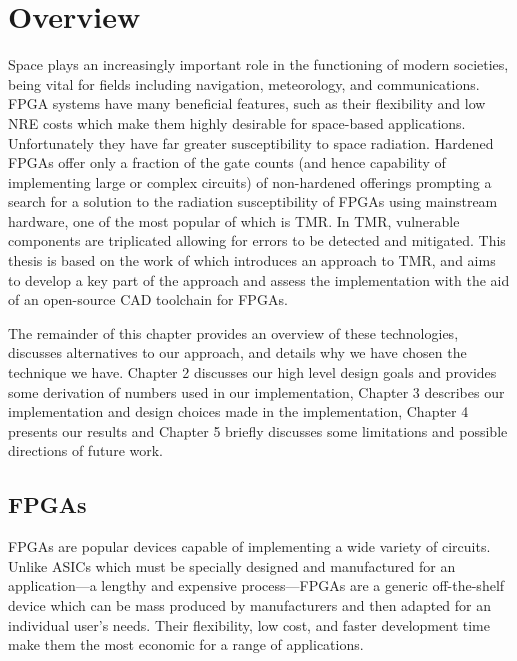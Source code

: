 \documentclass[12pt,final,oneside]{dwThesis} %
\begin{document}
   \section{Overview}
   Space plays an increasingly
   important role in the functioning of modern societies, being vital for
   fields including navigation, meteorology, and
   communications\cite{OECDSpace}. \gls{FPGA} systems have many beneficial
   features, such as their flexibility and low \gls{NRE} costs which make them
   highly desirable for space-based applications. Unfortunately they have far
   greater susceptibility to space radiation. Hardened \glspl{FPGA} offer only
   a fraction of the gate counts (and hence capability of implementing large or
   complex circuits) of non-hardened offerings prompting a search for a
   solution to the radiation susceptibility of \glspl{FPGA} using mainstream
   hardware, one of the most popular of which is \gls{TMR}\cite{VFPGATMR}. In
   \gls{TMR}, vulnerable components are triplicated allowing for errors to be
   detected and mitigated. This thesis is based on the work
   of\cite{DiesselChange} which introduces an approach to \gls{TMR}, and aims
   to develop a key part of the approach and assess the implementation with the
   aid of an open-source \gls{CAD} toolchain for \glspl{FPGA}.
   
   The remainder of this chapter provides an overview of
   these technologies, discusses alternatives to our approach, and details why
   we have chosen the technique we have. Chapter 2 discusses our high level design goals and provides some derivation of numbers used in our implementation,
   Chapter 3 describes our implementation and design choices made
   in the implementation,
   Chapter 4 presents our results and
   Chapter 5 briefly discusses some limitations and possible directions of future work.
   \subsection{\glspl{FPGA}
   } \glspl{FPGA} are popular devices
   capable of implementing a wide variety of circuits. Unlike \glspl{ASIC}
   which must be specially designed and manufactured for an application---a
   lengthy and expensive process---\glspl{FPGA} are a generic off-the-shelf
   device which can be mass produced by manufacturers and then adapted for an
   individual user's needs. Their flexibility, low cost, and faster development
   time make them the most economic for a range of applications.
\end{document}
